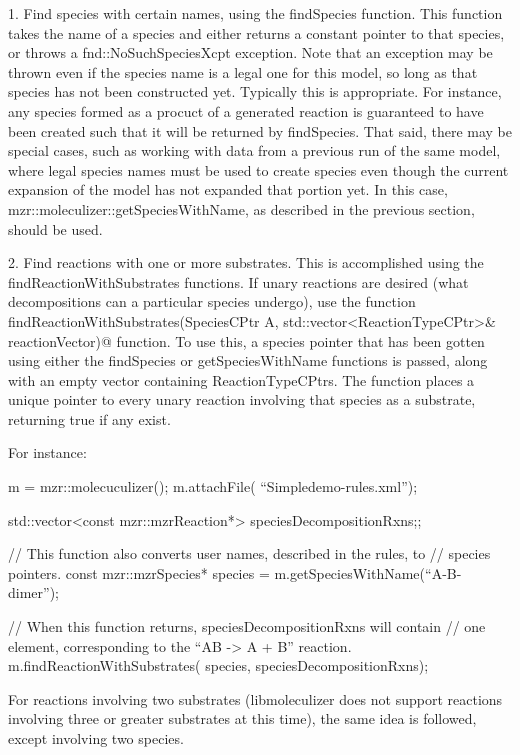 1.
Find species with certain names, using the findSpecies function.  This
function takes the name of a species and either returns a constant
pointer to that species, or throws a fnd::NoSuchSpeciesXcpt
exception.  Note that an exception may be thrown even if the species
name is a legal one for this model, so long as that species has not
been constructed yet.  Typically this is appropriate.  For instance,
any species formed as a procuct of a generated reaction is guaranteed
to have been created such that it will be returned by findSpecies.
That said, there may be special cases, such as working with data from
a previous run of the same model, where legal species names must be
used to create species even though the current expansion of the model
has not expanded that portion yet.  In this case,
mzr::moleculizer::getSpeciesWithName, as described in the previous
section, should be used.  

2.  Find reactions with one or more substrates.
This is accomplished using the findReactionWithSubstrates functions.
If unary reactions are desired (what decompositions can a particular
species undergo), use the function 
\lstinline@bool findReactionWithSubstrates(SpeciesCPtr A, std::vector<ReactionTypeCPtr>& reactionVector)@ function.  To use 
this, a species pointer that has been gotten using either the
findSpecies or getSpeciesWithName functions is passed, along with an
empty vector containing ReactionTypeCPtrs.  The function places a
unique pointer to every unary reaction involving that species as a
substrate, returning true if any exist.  

For instance:
\begin{ExampleCPP}
m = mzr::molecuculizer();
m.attachFile( ``Simpledemo-rules.xml''); 

std::vector<const mzr::mzrReaction*> speciesDecompositionRxns;;

// This function also converts user names, described in the rules, to
// species pointers.
const mzr::mzrSpecies* species = m.getSpeciesWithName(``A-B-dimer'');

// When this function returns, speciesDecompositionRxns will contain
// one element, corresponding to the ``AB -> A + B'' reaction.  
m.findReactionWithSubstrates( species, speciesDecompositionRxns);
\end{ExampleCPP}

For reactions involving two substrates (libmoleculizer does not
support reactions involving three or greater substrates at this time),
the same idea is followed, except involving two species.  

